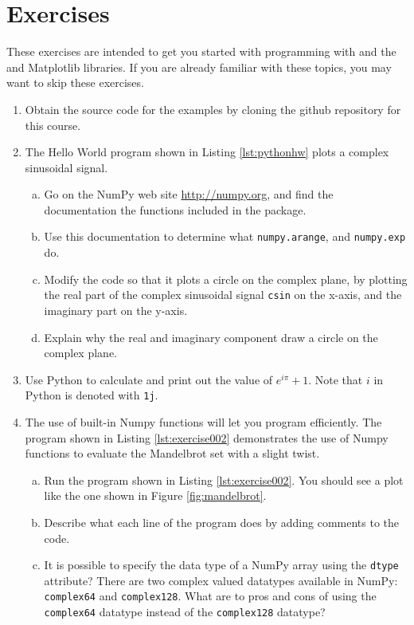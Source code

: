 \newpage
\section{Exercises}

These exercises are intended to get you started with programming with
\emph{} and the \emph{} and
Matplotlib libraries. If you are already familiar with these topics,
you may want to skip these exercises.

\begin{enumerate}
 \item Obtain the source code for the examples by cloning the github
   repository for this course. 
\item The Hello World program shown in Listing \ref{lst:pythonhw} plots a complex sinusoidal signal. 
  \begin{enumerate}[a)]
  \item Go on the NumPy web site \url{http://numpy.org}, and find the documentation the functions included in the package.
  \item Use this documentation to determine what \verb|numpy.arange|, and \verb|numpy.exp| do. 
  \item Modify the code so that it plots a circle on the complex
    plane, by plotting the real part of the complex sinusoidal
    signal \verb|csin| on the x-axis, and the imaginary part on the
    y-axis.
  \item Explain why the real and imaginary component draw a circle on the complex plane.
  \end{enumerate}

\item Use Python to calculate and print out the value of $e^{i \pi} + 1$. Note that $i$ in Python is denoted
  with \verb|1j|.
  
\item The use of built-in Numpy functions will let you program
  efficiently. The program shown in Listing \ref{lst:exercise002}
  demonstrates the use of Numpy functions to evaluate the Mandelbrot
  set with a slight twist.



\begin{enumerate}[a)]
  \item Run the program shown in Listing \ref{lst:exercise002}. You
    	should see a plot like the one shown in Figure \ref{fig:mandelbrot}.
  \item Describe what each line of the program does by adding comments to the code.
  \item It is possible to specify the data type of a NumPy array
      	using the \verb|dtype| attribute? There are two complex valued
      	datatypes available in NumPy: \verb|complex64| and \verb|complex128|. 
      	What are to pros and cons of using the \verb|complex64| datatype 
      	instead of the \verb|complex128| datatype? 
\end{enumerate}



\end{enumerate}
